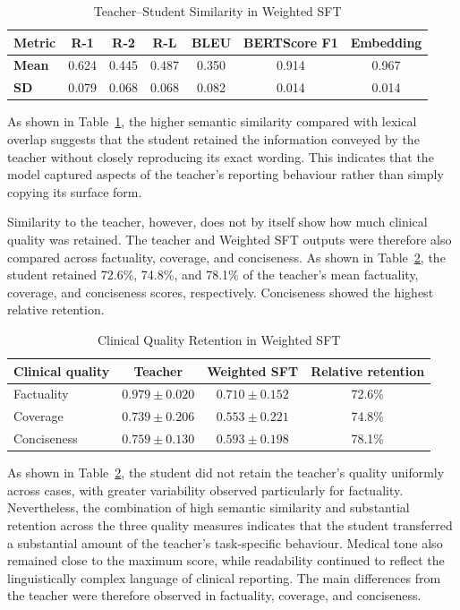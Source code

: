\documentclass[ %
                    author={Aman Kumar Singh},
                supervisor={Dr. Edwin Simpson},
                    degree={MSc},
                     title={Quality-Aware Knowledge Distillation of Large Language Models for Efficient Personalised Clinical Report Generation},
                  subtitle={},
                      type={},
                      year={2021}]{dissertation}
\begin{document}
\begin{table}[H]
\centering
\footnotesize
\caption{Teacher--Student Similarity in Weighted SFT}
\label{tab:teacher_student_similarity}
\begin{tabular}{lcccccc}
\hline
\textbf{Metric} & R-1 & R-2 & R-L & BLEU & BERTScore F1 & Embedding \\
\hline
\textbf{Mean} & 0.624 & 0.445 & 0.487 & 0.350 & 0.914 & 0.967 \\
\textbf{SD} & 0.079 & 0.068 & 0.068 & 0.082 & 0.014 & 0.014 \\
\hline
\end{tabular}
\end{table}

As shown in Table~\ref{tab:teacher_student_similarity}, the higher semantic
similarity compared with lexical overlap suggests that the student retained
the information conveyed by the teacher without closely reproducing its
exact wording. This indicates that the model captured aspects of the
teacher's reporting behaviour rather than simply copying its surface form.

Similarity to the teacher, however, does not by itself show how much clinical
quality was retained. The teacher and Weighted SFT outputs were therefore
also compared across factuality, coverage, and conciseness. As shown in
Table~\ref{tab:quality_retention}, the student retained 72.6\%, 74.8\%, and
78.1\% of the teacher's mean factuality, coverage, and conciseness scores,
respectively. Conciseness showed the highest relative retention.
\vspace{-15pt}

\begin{table}[H]
\centering
\footnotesize
\caption{Clinical Quality Retention in Weighted SFT}
\label{tab:quality_retention}
\begin{tabular}{lccc}
\hline
\textbf{Clinical quality} & \textbf{Teacher} & \textbf{Weighted SFT} &
\textbf{Relative retention} \\
\hline
Factuality & $0.979\pm0.020$ & $0.710\pm0.152$ & 72.6\% \\
Coverage & $0.739\pm0.206$ & $0.553\pm0.221$ & 74.8\% \\
Conciseness & $0.759\pm0.130$ & $0.593\pm0.198$ & 78.1\% \\
\hline
\end{tabular}
\end{table}

As shown in Table~\ref{tab:quality_retention}, the student did not retain
the teacher's quality uniformly across cases, with greater variability
observed particularly for factuality. Nevertheless, the combination of
high semantic similarity and substantial retention across the three quality
measures indicates that the student transferred a substantial amount of the
teacher's task-specific behaviour. Medical tone also remained close to the
maximum score, while readability continued to reflect the linguistically
complex language of clinical reporting. The main differences from the
teacher were therefore observed in factuality, coverage, and conciseness.
\end{document}
